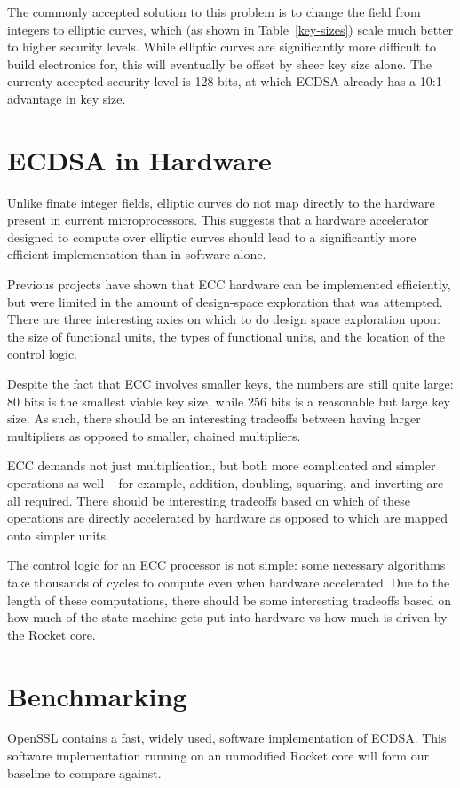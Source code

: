 \documentclass[twocolumn]{article}
\begin{document}
The commonly accepted solution to this problem is to change the field
from integers to elliptic curves, which (as shown in
Table~\ref{key-sizes}) scale much better to higher security levels.
While elliptic curves are significantly more difficult to build
electronics for, this will eventually be offset by sheer key size
alone.  The currenty accepted security level is 128 bits, at which
ECDSA already has a 10:1 advantage in key size.

\section{ECDSA in Hardware}

Unlike finate integer fields, elliptic curves do not map directly to
the hardware present in current microprocessors\cite{kss-ecdsa}.  This
suggests that a hardware accelerator designed to compute over elliptic
curves should lead to a significantly more efficient implementation
than in software alone.

Previous projects\cite{nnll-ecdsa_hw} have shown that ECC hardware can
be implemented efficiently, but were limited in the amount of
design-space exploration that was attempted\cite{mmm-hw_ecc}.  There
are three interesting axies on which to do design space exploration
upon: the size of functional units, the types of functional units, and
the location of the control logic.

Despite the fact that ECC involves smaller keys, the numbers are still
quite large: 80 bits is the smallest viable key size, while 256 bits
is a reasonable but large key size.  As such, there should be an
interesting tradeoffs between having larger multipliers as opposed to
smaller, chained multipliers.

ECC demands not just multiplication, but both more complicated and
simpler operations as well -- for example, addition, doubling,
squaring, and inverting are all required.  There should be interesting
tradeoffs based on which of these operations are directly accelerated
by hardware as opposed to which are mapped onto simpler units.

The control logic for an ECC processor is not simple: some necessary
algorithms take thousands of cycles\cite{mmm-hw_ecc} to compute even
when hardware accelerated.  Due to the length of these computations,
there should be some interesting tradeoffs based on how much of the
state machine gets put into hardware vs how much is driven by the
Rocket core.

\section{Benchmarking}

OpenSSL contains a fast, widely used, software implementation of
ECDSA\cite{kasper-openssl_ecc}.  This software implementation running
on an unmodified Rocket core will form our baseline to compare
against.



\end{document}
